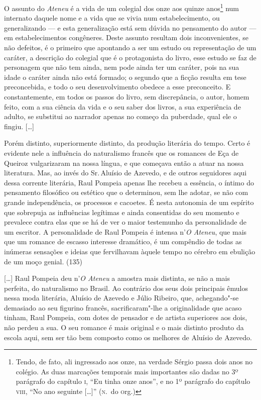 O assunto do \textit{Ateneu}
é a vida de um colegial dos onze aos quinze anos\footnote{Tendo, de
fato, ali ingressado aos onze, na verdade Sérgio passa dois anos no
colégio. As duas marcações temporais mais importantes são dadas no
3º parágrafo do capítulo \textsc{i}, ``Eu tinha onze anos'', e
no 1º parágrafo do capítulo \textsc{viii}, ``No ano
seguinte [\ldots]'' (\textsc{n}.~do \textsc{o}rg.)} num internato daquele nome
e a vida que se vivia num estabelecimento, ou generalizando --- e esta
generalização está sem dúvida no pensamento do autor --- em
estabelecimentos congêneres. Deste assunto resultam dois
inconvenientes, se não defeitos, é o primeiro que apontando a ser um
estudo ou representação de um caráter, a descrição do colegial que é o
protagonista do livro, esse estudo se faz de personagem que não tem
ainda, nem pode ainda ter um caráter, pois na sua idade o caráter ainda
não está formado; o segundo que a ficção resulta em tese preconcebida,
e todo o seu desenvolvimento obedece a esse preconceito. E
constantemente, em todos os passos do livro, sem discrepância, o autor,
homem feito, com a sua ciência da vida e o seu saber dos livros, a sua
experiência de adulto, se substitui ao narrador apenas no começo da
puberdade, qual ele o fingiu.
[\ldots] 

Porém distinto, superiormente distinto, da produção
literária do tempo. Certo é evidente nele a influência do naturalismo
francês que os romances de Eça de Queiroz vulgarizaram na nossa língua,
e que começava então a atuar na nossa literatura. Mas, ao invés do Sr.\,Aluísio de Azevedo, e de outros seguidores aqui dessa corrente
literária, Raul Pompeia apenas lhe recebeu a essência, o íntimo do
pensamento filosófico ou estético que o determinou, sem lhe adotar, se
não com grande independência, os processos e cacoetes. É nesta
autonomia de um espírito que sobrepuja as influências legítimas e ainda
consentidas do seu momento e prevalece contra elas que se há de ver o
maior testemunho da personalidade de um escritor. A personalidade de
Raul Pompeia é intensa n'\textit{O Ateneu},
que mais que um romance de escasso interesse dramático, é um compêndio
de todas as inúmeras sensações e ideias que fervilhavam àquele tempo no
cérebro em ebulição de um moço genial.  (135)



[\ldots] Raul Pompeia deu n'\textit{O Ateneu} a amostra mais distinta, se não a mais
perfeita, do naturalismo no Brasil. Ao contrário dos seus dois
principais êmulos nessa moda literária, Aluísio de Azevedo e Júlio
Ribeiro, que, achegando"-se demasiado ao seu figurino francês,
sacrificaram"-lhe a originalidade que acaso tinham, Raul Pompeia, com
dotes de pensador e de artista superiores aos dois, não perdeu a sua. O
seu romance é mais original e o mais distinto produto da escola aqui,
sem ser tão bem composto como os melhores de Aluísio de Azevedo. 

